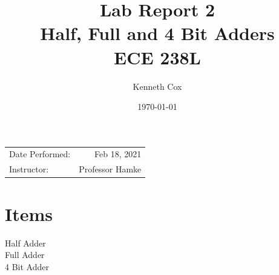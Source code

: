 \documentclass{article}
\title{Lab Report 2 \\ Half, Full and 4 Bit Adders \\ECE 238L \\} %
\author{Kenneth Cox}
\date{\today} %
\begin{document}
\maketitle %

\begin{center}
\begin{tabular}{l r}
Date Performed: &Feb 18, 2021 \\ %
Instructor: & Professor Hamke %
\end{tabular}
\end{center}





\section{Items}

\begin{description}
\item[Half Adder]
\item[Full Adder]
\item[4 Bit Adder]
\end{description} 
 
\end{document}
